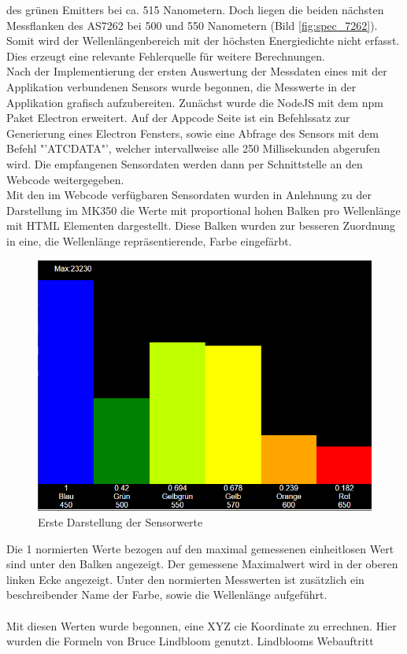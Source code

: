 \documentclass[11pt]{scrartcl}
\begin{document}
des grünen Emitters bei ca. 515 Nanometern. Doch liegen die beiden nächsten Messflanken des AS7262 bei 500 und 550 Nanometern (Bild \ref{fig:spec_7262}).
Somit wird der Wellenlängenbereich mit der höchsten Energiedichte nicht erfasst. Dies erzeugt eine relevante Fehlerquelle für weitere
Berechnungen.\\
Nach der Implementierung der ersten Auswertung der Messdaten eines mit der Applikation verbundenen Sensors wurde begonnen, die Messwerte in der
Applikation grafisch aufzubereiten. Zunächst wurde die NodeJS mit dem \ac{npm} Paket Electron erweitert. Auf der Appcode Seite ist ein Befehlssatz
zur Generierung eines Electron Fensters, sowie eine Abfrage des Sensors mit dem Befehl "'ATCDATA"', welcher intervallweise alle 250 Millisekunden
abgerufen wird. Die empfangenen Sensordaten werden dann per Schnittstelle an den Webcode weitergegeben.\\
Mit den im Webcode verfügbaren Sensordaten wurden in Anlehnung zu der Darstellung im MK350 die Werte mit proportional hohen Balken pro Wellenlänge
mit HTML Elementen dargestellt. Diese Balken wurden zur besseren Zuordnung in eine, die Wellenlänge repräsentierende, Farbe eingefärbt.
\begin{figure}[H]
    \begin{center}
        \includegraphics[width=.6\textwidth]{images/app_dummy_spectrum.png}
    \end{center}
    \caption{Erste Darstellung der Sensorwerte}
\end{figure}
\noindent
Die 1 normierten Werte bezogen auf den maximal gemessenen einheitlosen Wert sind unter den Balken angezeigt. Der gemessene Maximalwert wird in der
oberen linken Ecke angezeigt. Unter den normierten Messwerten ist zusätzlich ein beschreibender Name der Farbe, sowie die Wellenlänge aufgeführt.\\
\\
Mit diesen Werten wurde begonnen, eine XYZ \ac{cie} Koordinate zu errechnen. Hier wurden die Formeln von Bruce Lindbloom genutzt. Lindblooms Webauftritt
\end{document}

